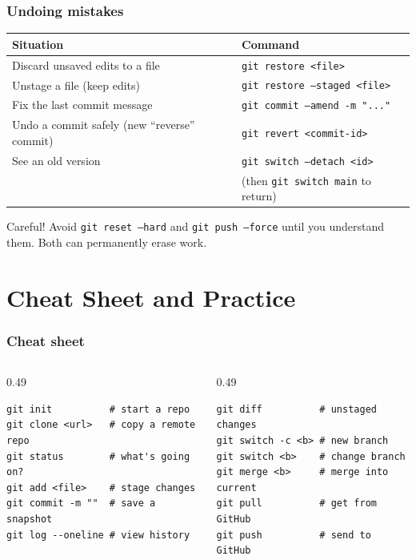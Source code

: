 \documentclass[aspectratio=169,10pt,compress]{beamer}
\newcommand{\cmd}[1]{\texttt{\color{gitred}#1}}
\begin{document}
\begin{frame}[t,fragile] \frametitle{Undoing mistakes}
  \small
  \begin{tabular}{@{}p{}p{}@{}}
    \toprule
    \textbf{Situation} & \textbf{Command} \\
    \midrule
    Discard unsaved edits to a file & \cmd{git restore <file>} \\
    Unstage a file (keep edits) & \cmd{git restore --staged <file>} \\
    Fix the last commit message & \cmd{git commit --amend -m "..."} \\
    Undo a commit safely (new ``reverse'' commit) & \cmd{git revert <commit-id>} \\
    See an old version & \cmd{git switch --detach <id>} \\
                       & (then \cmd{git switch main} to return) \\
    \bottomrule
  \end{tabular}

  \vspace{1em}
  \begin{alertblock}{Careful!}
    Avoid \cmd{git reset --hard} and \cmd{git push --force} until you understand them.
    Both can permanently erase work.
  \end{alertblock}
\end{frame}

\section[Practice]{Cheat Sheet and Practice}

\begin{frame}[t,fragile] \frametitle{Cheat sheet}
  \begin{columns}[T]
    \begin{column}{0.49\textwidth}
\begin{lstlisting}
git init          # start a repo
git clone <url>   # copy a remote repo
git status        # what's going on?
git add <file>    # stage changes
git commit -m ""  # save a snapshot
git log --oneline # view history
\end{lstlisting}
    \end{column}
    \begin{column}{0.49\textwidth}
\begin{lstlisting}
git diff          # unstaged changes
git switch -c <b> # new branch
git switch <b>    # change branch
git merge <b>     # merge into current
git pull          # get from GitHub
git push          # send to GitHub
\end{lstlisting}
    \end{column}
  \end{columns}
\end{frame}
\end{document}
